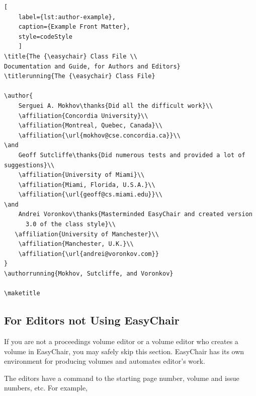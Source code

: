 \documentclass[]{easychair}
\newcommand{\easychair}{\textsf{easychair}}
\begin{document}
\begin{lstlisting}[
    label={lst:author-example},
    caption={Example Front Matter},
    style=codeStyle
    ]
\title{The {\easychair} Class File \\
Documentation and Guide, for Authors and Editors}
\titlerunning{The {\easychair} Class File}

\author{
    Serguei A. Mokhov\thanks{Did all the difficult work}\\
    \affiliation{Concordia University}\\
    \affiliation{Montreal, Quebec, Canada}\\
    \affiliation{\url{mokhov@cse.concordia.ca}}\\
\and
    Geoff Sutcliffe\thanks{Did numerous tests and provided a lot of suggestions}\\
    \affiliation{University of Miami}\\
    \affiliation{Miami, Florida, U.S.A.}\\
    \affiliation{\url{geoff@cs.miami.edu}}\\
\and
    Andrei Voronkov\thanks{Masterminded EasyChair and created version
      3.0 of the class style}\\
   \affiliation{University of Manchester}\\
    \affiliation{Manchester, U.K.}\\
    \affiliation{\url{andrei@voronkov.com}}
}
\authorrunning{Mokhov, Sutcliffe, and Voronkov}

\maketitle
\end{lstlisting}


\subsection{For Editors not Using EasyChair}
\label{sect:for-editors}

If you are not a proceedings volume editor or a volume editor who
creates a volume in EasyChair, you may safely skip this
section. EasyChair has its own environment for producing volumes and
automates editor's work.

The editors have a command to the starting page number, volume and issue 
numbers, etc. For example,
\end{document}
